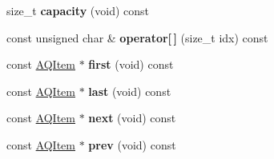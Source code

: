 \begin{DoxyCompactItemize}
\item 
size\+\_\+t {\bfseries capacity} (void) const \hypertarget{class_a_q_item_aba43b837efe456e423cf290b7bdae608}{}\label{class_a_q_item_aba43b837efe456e423cf290b7bdae608}

\item 
const unsigned char \& {\bfseries operator\mbox{[}$\,$\mbox{]}} (size\+\_\+t idx) const \hypertarget{class_a_q_item_a395900d5781030372dfc231d2361d41c}{}\label{class_a_q_item_a395900d5781030372dfc231d2361d41c}

\item 
const \hyperlink{class_a_q_item}{A\+Q\+Item} $\ast$ {\bfseries first} (void) const \hypertarget{class_a_q_item_ab109099474cb358ce7b2cd0cbbf4a530}{}\label{class_a_q_item_ab109099474cb358ce7b2cd0cbbf4a530}

\item 
const \hyperlink{class_a_q_item}{A\+Q\+Item} $\ast$ {\bfseries last} (void) const \hypertarget{class_a_q_item_a71b8a01fb113490f2c96bf9a7cf60e8c}{}\label{class_a_q_item_a71b8a01fb113490f2c96bf9a7cf60e8c}

\item 
const \hyperlink{class_a_q_item}{A\+Q\+Item} $\ast$ {\bfseries next} (void) const \hypertarget{class_a_q_item_a852962115eaa0b0bd8d356a682778afe}{}\label{class_a_q_item_a852962115eaa0b0bd8d356a682778afe}

\item 
const \hyperlink{class_a_q_item}{A\+Q\+Item} $\ast$ {\bfseries prev} (void) const \hypertarget{class_a_q_item_a5afdc65d0570f2ee4bac6c3d61c2e16f}{}\label{class_a_q_item_a5afdc65d0570f2ee4bac6c3d61c2e16f}

\end{DoxyCompactItemize}
